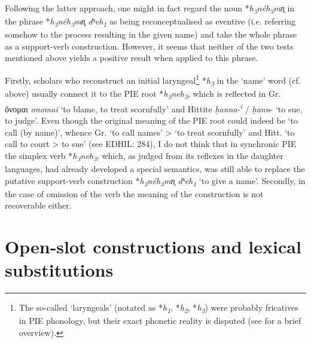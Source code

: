 \documentclass[output=paper,colorlinks,citecolor=brown]{langscibook}
\begin{document}
Following the latter approach, one might in fact regard the noun *\textit{h\textsubscript{3}néh\textsubscript{3}mn̥} in the phrase *\textit{h\textsubscript{3}néh\textsubscript{3}mn̥ dʰeh\textsubscript{1}} as being reconceptualised as eventive (i.e. referring somehow to the process resulting in the given name) and take the whole phrase as a support-verb construction. However, it seems that neither of the two tests mentioned above yields a positive result when applied to this phrase.


Firstly, scholars who reconstruct an initial laryngeal\footnote{The so-called `laryngeals' (notated as *\textit{h\textsubscript{1}}, *\textit{h\textsubscript{2}}, *\textit{h\textsubscript{3}}) were probably fricatives in PIE phonology, but their exact phonetic reality is disputed (see \citealt[10--13]{Byrd2015} for a brief overview).}
*\textit{h\textsubscript{3}} in the ‘name’ word (cf. above) usually connect it to the PIE root *\textit{h\textsubscript{3}neh\textsubscript{3}}, which is reflected in Gr. ὄνομαι \textit{onomai} ‘to blame, to treat scornfully’ and Hittite \textit{ḫanna-\textsuperscript{i}} / \textit{ḫann}- ‘to sue, to judge’. Even though the original meaning of the PIE root could indeed be ‘to call (by name)’, whence Gr. ‘to call names’ > ‘to treat scornfully’ and Hitt. ‘to call to court > to sue’ (see EDHIL: 284), I do not think that in synchronic PIE the simplex verb *\textit{h\textsubscript{3}neh\textsubscript{3}}, which, as judged from its reflexes in the daughter languages, had already developed a special semantics, was still able to replace the putative support-verb construction *\textit{h\textsubscript{3}néh\textsubscript{3}mn̥ dʰeh\textsubscript{1}} ‘to give a name’. Secondly, in the case of omission of the verb the meaning of the construction is not recoverable either.

\section{Open-slot constructions and lexical substitutions}
\end{document}
